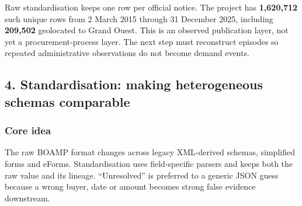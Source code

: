 Raw standardisation keeps one row per official notice. The project has
\textbf{1,620,712} such unique rows from 2 March 2015 through 31
December 2025, including \textbf{209,502} geolocated to Grand Ouest.
This is an observed publication layer, not yet a procurement-process
layer. The next step must reconstruct episodes so repeated
administrative observations do not become demand events.

\subsection{4. Standardisation: making heterogeneous schemas
comparable}\label{4-standardisation-making-heterogeneous-schemas-comparable}

\subsubsection{Core idea}\label{core-idea}

The raw BOAMP format changes across legacy XML-derived schemas,
simplified forms and eForms. Standardisation uses field-specific parsers
and keeps both the raw value and its lineage. ``Unresolved'' is
preferred to a generic JSON guess because a wrong buyer, date or amount
becomes strong false evidence downstream.


